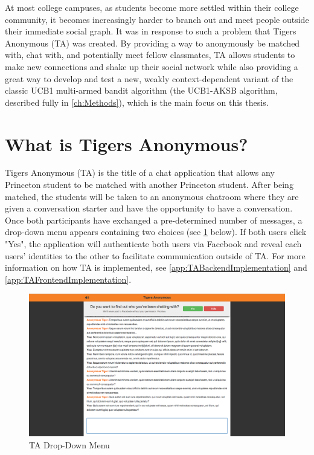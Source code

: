 At most college campuses, as students become more settled within their college community, it becomes increasingly harder to branch out and meet people outside their immediate social graph. It was in response to such a problem that Tigers Anonymous (TA) was created. By providing a way to anonymously be matched with, chat with, and potentially meet fellow classmates, TA allows students to make new connections and shake up their social network while also providing a great way to develop and test a new, weakly context-dependent variant of the classic UCB1 multi-armed bandit algorithm (the UCB1-AKSB algorithm, described fully in \ref{ch:Methods}), which is the main focus on this thesis.

\section{What is Tigers Anonymous?}

Tigers Anonymous (TA) is the title of a chat application that allows any Princeton student to be matched with another Princeton student. After being matched, the students will be taken to an anonymous chatroom where they are given a conversation starter and have the opportunity to have a conversation. Once both participants have exchanged a pre-determined number of messages, a drop-down menu appears containing two choices (see \ref{fig:DropDownMenu} below). If both users click "Yes", the application will authenticate both users via Facebook and reveal each users' identities to the other to facilitate communication outside of TA. For more information on how TA is implemented, see \ref{app:TABackendImplementation} and \ref{app:TAFrontendImplementation}.

\begin{figure}[h]
\centering
\includegraphics[trim= 120mm 0mm 120mm 0mm, clip, scale=0.36]{./Figures/FullChatDropDown}
\caption{TA Drop-Down Menu}
\label{fig:DropDownMenu}
\end{figure}

